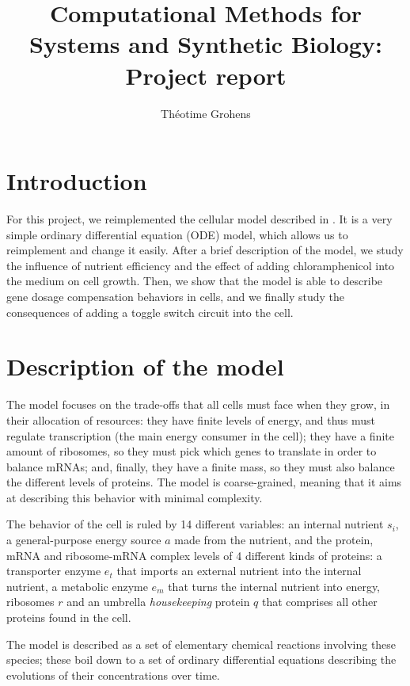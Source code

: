 \documentclass[a4paper]{article}
\title{Computational Methods for \\Systems and Synthetic Biology:\\ Project report}
\author{Théotime Grohens}
\begin{document}
\maketitle

\section{Introduction}

For this project, we reimplemented the cellular model described in \cite{weisse}.
It is a very simple ordinary differential equation (ODE) model, which allows us to reimplement and change it easily.
After a brief description of the model, we study the influence of nutrient efficiency and the effect of adding chloramphenicol into the medium on cell growth.
Then, we show that the model is able to describe gene dosage compensation behaviors in cells, and we finally study the consequences of adding a toggle switch circuit into the cell.

\section{Description of the model}

The model focuses on the trade-offs that all cells must face when they grow, in their allocation of resources: they have finite levels of energy, and thus must regulate transcription (the main energy consumer in the cell); they have a finite amount of ribosomes, so they must pick which genes to translate in order to balance mRNAs; and, finally, they have a finite mass, so they must also balance the different levels of proteins.
The model is coarse-grained, meaning that it aims at describing this behavior with minimal complexity.

The behavior of the cell is ruled by 14 different variables: an internal nutrient $s_i$, a general-purpose energy source $a$ made from the nutrient, and the protein, mRNA and ribosome-mRNA complex levels of 4 different kinds of proteins: a transporter enzyme $e_t$ that imports an external nutrient into the internal nutrient, a metabolic enzyme $e_m$ that turns the internal nutrient into energy, ribosomes $r$ and an umbrella \emph{housekeeping} protein $q$ that comprises all other proteins found in the cell.

The model is described as a set of elementary chemical reactions involving these species; these boil down to a set of ordinary differential equations describing the evolutions of their concentrations over time.
\end{document}
